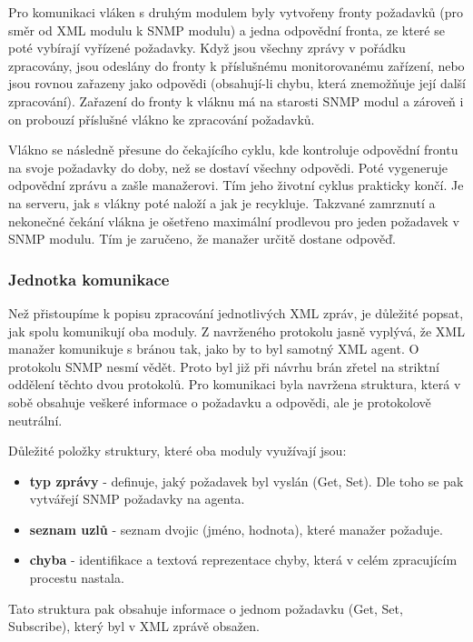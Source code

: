 Pro komunikaci vláken s druhým modulem byly vytvořeny fronty požadavků (pro směr od XML modulu k SNMP modulu)
a jedna odpovědní fronta, ze které se poté vybírají vyřízené požadavky.
Když jsou všechny zprávy v pořádku zpracovány, jsou odeslány do fronty k příslušnému monitorovanému zařízení, nebo jsou rovnou zařazeny
jako odpovědi (obsahují-li chybu, která znemožňuje její další zpracování). Zařazení do fronty k vláknu má na starosti SNMP modul a zároveň
i on probouzí příslušné vlákno ke zpracování požadavků.

Vlákno se následně přesune do čekajícího cyklu, kde kontroluje odpovědní frontu na svoje požadavky do doby, než se dostaví všechny odpovědi. 
Poté vygeneruje odpovědní zprávu a zašle manažerovi. Tím jeho životní cyklus prakticky končí. Je na serveru, jak s vlákny poté naloží a jak 
je recykluje. Takzvané zamrznutí a nekonečné čekání vlákna je ošetřeno maximální prodlevou pro jeden požadavek v SNMP modulu. Tím je zaručeno, že
manažer určitě dostane odpověď.

\subsubsection*{Jednotka komunikace}
Než přistoupíme k popisu zpracování jednotlivých XML zpráv, je důležité popsat, jak spolu komunikují oba moduly. Z navrženého protokolu jasně 
vyplývá, že XML manažer komunikuje s bránou tak, jako by to byl samotný XML agent. O protokolu SNMP nesmí vědět. Proto byl již při návrhu
brán zřetel na striktní oddělení těchto dvou protokolů. Pro komunikaci byla navržena struktura, která v sobě obsahuje veškeré informace o
požadavku a odpovědi, ale je protokolově neutrální.

Důležité položky struktury, které oba moduly využívají jsou:
\begin{itemize}
	\item \textbf{typ zprávy} - definuje, jaký požadavek byl vyslán (Get, Set). Dle toho se pak vytvářejí SNMP požadavky na agenta.
	\item \textbf{seznam uzlů} - seznam dvojic (jméno, hodnota), které manažer požaduje.
	\item \textbf{chyba} - identifikace a textová reprezentace chyby, která v celém zpracujícím procestu nastala.
\end{itemize}

Tato struktura pak obsahuje informace o jednom požadavku (Get, Set, Subscribe), který byl v XML zprávě obsažen. 


